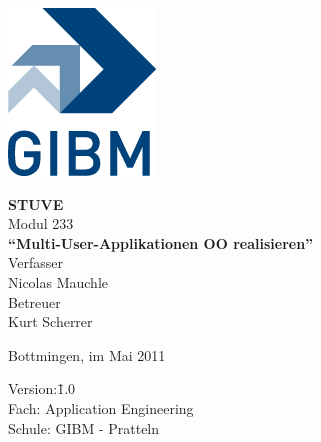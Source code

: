 \begin{titlepage}
\sffamily
\centering
\includegraphics{images/gibm_logo.png}

\vfill
{\bfseries\Huge STUVE}\\
\vfill
Modul 233\\[1ex]
{\bfseries\Large "`Multi-User-Applikationen OO realisieren"'}\\
\vfill
Verfasser\\[1ex]
Nicolas Mauchle\\
\vfill
Betreuer\\[1ex]
{\large Kurt Scherrer}\\
\vfill

\raggedright
\small
Bottmingen, im Mai 2011\\[2cm]
\begin{tabbing}
Version:\quad\quad\quad \=1.0\\
Fach: \> Application Engineering \\
Schule: \> GIBM - Pratteln
\end{tabbing}
\end{titlepage}
\newpage
